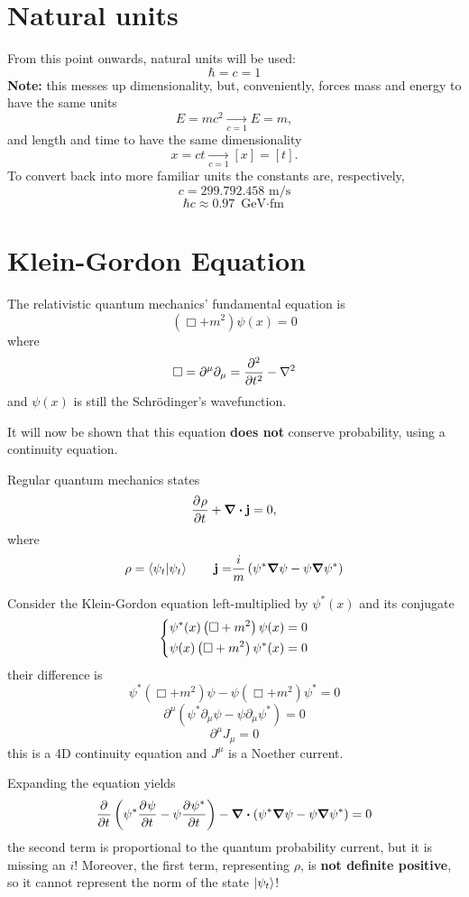 
\section{Natural units}
From this point onwards, natural units will be used:
$$\hbar = c = 1$$
\textbf{Note:} this messes up dimensionality, but, conveniently, forces mass and energy to have
the same units
$$E=mc^2\underset{c=1}\rightarrow E=m,$$
and length and time to have the same dimensionality
$$x=ct\underset{c=1}\rightarrow[x]=[t].$$
To convert back into more familiar units the constants are, respectively,
$$c=299.792.458\text{ m/s}$$
$$\hbar c \approx 0.97 \text{ GeV$\cdot$fm}$$
\section{Klein-Gordon Equation}
The relativistic quantum mechanics' fundamental equation is
$$(\Box+m^2)\psi(x)=0$$
where
$$\Box = \partial^\mu\partial_\mu=\pdv[2]{}{t}-\laplacian$$
and $\psi(x)$ is still the Schrödinger's wavefunction.

It will now be shown that this equation \textbf{does not} conserve probability, using a continuity
equation.

Regular quantum mechanics states
$$\pdv[]{\rho}{t}+\div\mathbf{j} = 0,$$
where
$$\rho=\bra{\psi_t}\ket{\psi_t}\quad\quad \mathbf{j=}\frac{i}{m}\left(\psi^*\grad\psi-\psi\grad\psi^*
\right)$$

Consider the Klein-Gordon equation left-multiplied by $\psi^*(x)$ and its conjugate
$$\begin{dcases}
  \psi^*(x)\left(\Box+m^2\right)\psi(x)=0\\
  \psi(x)\left(\Box+m^2\right)\psi^*(x)=0
  \end{dcases}$$
their difference is
$$\psi^*(\Box+m^2)\psi - \psi(\Box+m^2)\psi^*=0$$
$$\partial^\mu(\psi^*\partial_\mu\psi - \psi\partial_\mu\psi^*)=0$$
$$\partial^\mu J_\mu=0$$
this is a 4D continuity equation and $J^\mu$ is a Noether current.

Expanding the equation yields
$$\pdv[]{}{t}\left(\psi^*\pdv[]{\psi}{t}-\psi\pdv[]{\psi^*}{t}\right)-\div\left(\psi^*\grad \psi
-\psi\grad\psi^*\right)=0$$
the second term is proportional to the quantum probability current, but it is missing an $i$!
Moreover, the first term, representing $\rho$, is \textbf{not definite positive}, so it cannot
represent the norm of the state $\ket{\psi_t}$!\\

